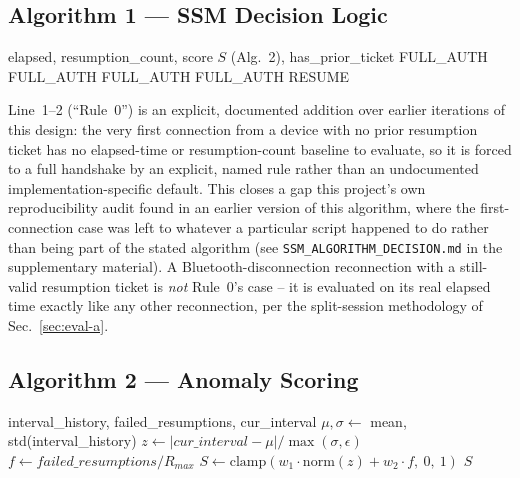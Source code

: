 \documentclass[conference]{IEEEtran}
\begin{document}
\subsection{Algorithm 1 --- SSM Decision Logic}
\label{sec:alg1}

\begin{algorithm}[t]
\caption{SSM Decision Logic}
\label{alg:ssm}
\begin{algorithmic}[1]
\Require elapsed, resumption\_count, score $S$ (Alg.~2), has\_prior\_ticket
  \State \Return FULL\_AUTH 
  \State \Return FULL\_AUTH
  \State \Return FULL\_AUTH
  \State \Return FULL\_AUTH
\Else
  \State \Return RESUME
\EndIf
\end{algorithmic}
\end{algorithm}

Line~1--2 (``Rule~0'') is an explicit, documented addition over earlier
iterations of this design: the very first connection from a device with no
prior resumption ticket has no elapsed-time or resumption-count baseline to
evaluate, so it is forced to a full handshake by an explicit, named rule
rather than an undocumented implementation-specific default. This closes a
gap this project's own reproducibility audit found in an earlier version of
this algorithm, where the first-connection case was left to whatever a
particular script happened to do rather than being part of the stated
algorithm (see \texttt{SSM\_ALGORITHM\_DECISION.md} in the supplementary
material). A Bluetooth-disconnection reconnection with a still-valid
resumption ticket is \emph{not} Rule~0's case -- it is evaluated on its
real elapsed time exactly like any other reconnection, per the split-session
methodology of Sec.~\ref{sec:eval-a}.

\subsection{Algorithm 2 --- Anomaly Scoring}
\label{sec:alg2}

\begin{algorithm}[t]
\caption{Anomaly Scoring}
\label{alg:anomaly}
\begin{algorithmic}[1]
\Require interval\_history, failed\_resumptions, cur\_interval
\State $\mu, \sigma \gets$ mean, std(interval\_history)
\State $z \gets |\mathit{cur\_interval} - \mu| / \max(\sigma, \epsilon)$
\State $f \gets \mathit{failed\_resumptions} / R_{max}$
\State $S \gets \mathrm{clamp}(w_1 \cdot \mathrm{norm}(z) + w_2 \cdot f,\ 0,\ 1)$
\State \Return $S$
\end{algorithmic}
\end{algorithm}
\end{document}
